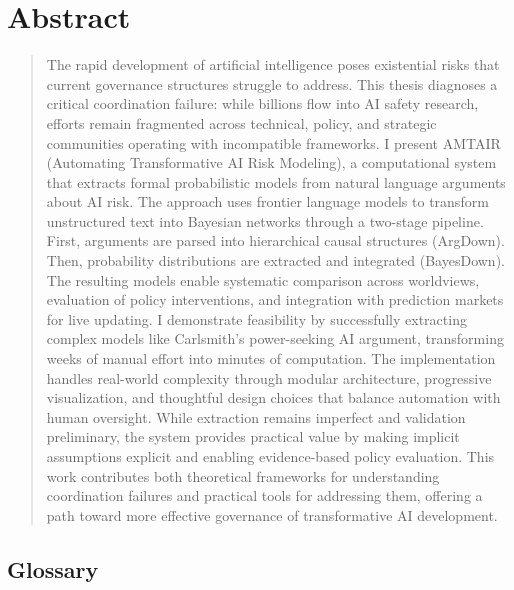 \documentclass[
  11pt,
  letterpaper,
  openany]{book}
\begin{document}
\chapter{Abstract}\label{sec-abstract}

\begin{quote}
The rapid development of artificial intelligence poses existential risks
that current governance structures struggle to address. This thesis
diagnoses a critical coordination failure: while billions flow into AI
safety research, efforts remain fragmented across technical, policy, and
strategic communities operating with incompatible frameworks. I present
AMTAIR (Automating Transformative AI Risk Modeling), a computational
system that extracts formal probabilistic models from natural language
arguments about AI risk. The approach uses frontier language models to
transform unstructured text into Bayesian networks through a two-stage
pipeline. First, arguments are parsed into hierarchical causal
structures (ArgDown). Then, probability distributions are extracted and
integrated (BayesDown). The resulting models enable systematic
comparison across worldviews, evaluation of policy interventions, and
integration with prediction markets for live updating. I demonstrate
feasibility by successfully extracting complex models like Carlsmith's
power-seeking AI argument, transforming weeks of manual effort into
minutes of computation. The implementation handles real-world complexity
through modular architecture, progressive visualization, and thoughtful
design choices that balance automation with human oversight. While
extraction remains imperfect and validation preliminary, the system
provides practical value by making implicit assumptions explicit and
enabling evidence-based policy evaluation. This work contributes both
theoretical frameworks for understanding coordination failures and
practical tools for addressing them, offering a path toward more
effective governance of transformative AI development.
\end{quote}

\section{Glossary}\label{sec-gloss.unnumbered}
\end{document}
